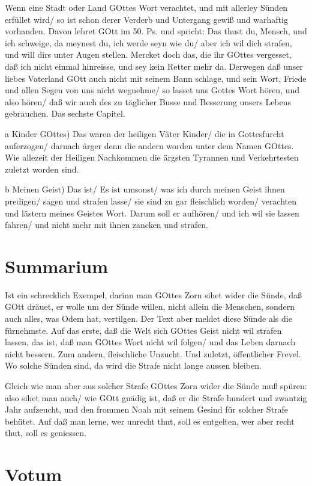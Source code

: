 Wenn eine Stadt oder Land GOttes Wort verachtet, und mit allerley Sünden erfüllet wird/ so ist schon derer Verderb und Untergang gewiß und warhaftig vorhanden. Davon lehret GOtt im 50. Ps. und spricht: Das thust du, Mensch, und ich schweige, da meynest du, ich werde seyn wie du/ aber ich wil dich strafen, und will dirs unter Augen stellen. Mercket doch das, die ihr GOttes vergesset, daß ich nicht einmal hinreisse, und sey kein Retter mehr da. Derwegen daß unser liebes Vaterland GOtt auch nicht mit seinem Bann schlage, und sein Wort, Friede und allen Segen von uns nicht wegnehme/ so lasset uns Gottes Wort hören, und also hören/ daß wir auch des zu täglicher Busse und Besserung unsers Lebens gebrauchen. Das sechste Capitel.

a Kinder GOttes) Das waren der heiligen Väter Kinder/ die in Gottesfurcht auferzogen/ darnach ärger denn die andern worden unter dem Namen GOttes. Wie allezeit der Heiligen Nachkommen die ärgsten Tyrannen und Verkehrtesten zuletzt worden sind.

b Meinen Geist) Das ist/ Es ist umsonst/ was ich durch meinen Geist ihnen predigen/ sagen und strafen lasse/ sie sind zu gar fleischlich worden/ verachten und lästern meines Geistes Wort. Darum soll er aufhören/ und ich wil sie lassen fahren/ und nicht mehr mit ihnen zancken und strafen.

\section{Summarium}

Ist ein schrecklich Exempel, darinn man GOttes Zorn sihet wider die Sünde, daß GOtt dräuet, er wolle um der Sünde willen, nicht allein die Menschen, sondern auch alles, was Odem hat, vertilgen. Der Text aber meldet diese Sünde als die fürnehmste. Auf das erste, daß die Welt sich GOttes Geist nicht wil strafen lassen, das ist, daß man GOttes Wort nicht wil folgen/ und das Leben darnach nicht bessern. Zum andern, fleischliche Unzucht. Und zuletzt, öffentlicher Frevel. Wo solche Sünden sind, da wird die Strafe nicht lange aussen bleiben.

Gleich wie man aber aus solcher Strafe GOttes Zorn wider die Sünde muß spüren: also sihet man auch/ wie GOtt gnädig ist, daß er die Strafe hundert und zwantzig Jahr aufzeucht, und den frommen Noah mit seinem Gesind für solcher Strafe behütet. Auf daß man lerne, wer unrecht thut, soll es entgelten, wer aber recht thut, soll es geniessen.

\section{Votum}

